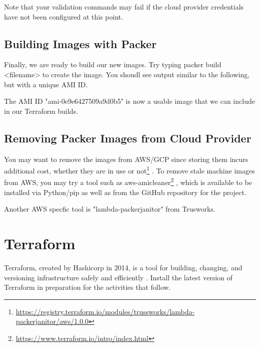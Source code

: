 Note that your validation commands may fail if the cloud provider
credentials have not been configured at this point.


\subsection{Building Images with Packer}

\justify
Finally, we are ready to build our new images. Try typing
packer build \textless{}filename\textgreater{} to create the image. You
shoudl see output similar to the following, but with a unique AMI ID.

\begin{Shaded}
   \begin{Highlighting}[]
       

      \NormalTok{==}\OperatorTok{>} 
      \ExtensionTok{--}\OperatorTok{>}
   \end{Highlighting}
\end{Shaded}

\justify
The AMI ID "ami-0e9e6427509a9d0b5" is now a usable image that we can
include in our Terraform builds.


\subsection{Removing Packer Images from Cloud Provider}

\justify
You may want to remove the images from AWS/GCP since storing them incurs
additional cost, whether they are in use or not\footnote{\url{https://registry.terraform.io/modules/trussworks/lambda-packerjanitor/aws/1.0.0}}
.
\justify
To remove stale machine images from AWS, you may try a tool such as
aws-amicleaner\footnote{\url{https://www.terraform.io/intro/index.html}}
, which is available to be installed via Python/pip as well as from the
GitHub repository for the project.

Another AWS specfic tool is "lambda-packerjanitor" from Trusworks.


\section{Terraform}

\justify
Terraform, created by Hashicorp in 2014, is a tool for building, changing, and versioning infrastructure safely and efficiently . Install the latest version of Terraform in preparation for the activities that follow.

